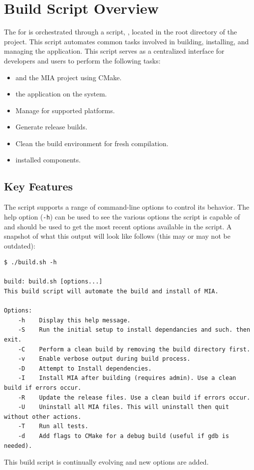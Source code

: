 \section{Build Script Overview}\label{section:build_script}

The  for  is orchestrated through a  script, , located in the root directory of the project. This script automates common tasks involved in building, installing, and managing the application. This script serves as a centralized interface for developers and users to perform the following tasks:
\begin{itemize}\itemsep0em
	\item {} and  the MIA project using CMake.
	\item {} the application on the system.
	\item Manage  for supported platforms.
	\item Generate release builds.
	\item Clean the build environment for fresh compilation.
	\item {} installed components.
\end{itemize}

\subsection{Key Features}

The script supports a range of command-line options to control its behavior. The help option (\texttt{-h}) can be used to see the various options the script is capable of and should be used to get the most recent options available in the script. A snapshot of what this output will look like follows (this may or may not be outdated):
\begin{lstlisting}[style=terminalstyle]
$ ./build.sh -h

build: build.sh [options...]
This build script will automate the build and install of MIA.

Options:
    -h    Display this help message.
	-S    Run the initial setup to install dependancies and such. then exit.
	-C    Perform a clean build by removing the build directory first.
	-v    Enable verbose output during build process.
	-D    Attempt to Install dependencies.
	-I    Install MIA after building (requires admin). Use a clean build if errors occur.
	-R    Update the release files. Use a clean build if errors occur.
	-U    Uninstall all MIA files. This will uninstall then quit without other actions.
	-T    Run all tests.
	-d    Add flags to CMake for a debug build (useful if gdb is needed).
\end{lstlisting}
This build script is continually evolving and new options are added.

